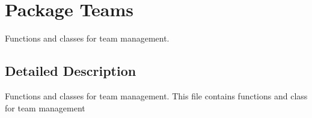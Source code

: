 \hypertarget{namespace_teams}{
\section{Package Teams}
\label{namespace_teams}
}


Functions and classes for team management.  




\subsection{Detailed Description}
Functions and classes for team management. This file contains functions and class for team management 